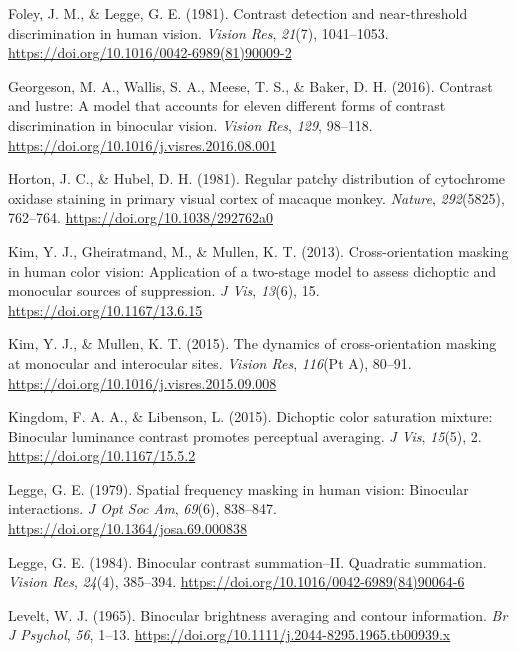 \documentclass[
  letterpaper,
  DIV=11,
  numbers=noendperiod]{scrartcl}
\newlength{\cslhangindent}
\newlength{\cslentryspacingunit} %
\newenvironment{CSLReferences}[2] %
 {%
  \setlength{\parindent}{0pt}
  \ifodd #1
  \let\oldpar\par
  \def\par{\hangindent=\cslhangindent\oldpar}
  \fi
  \setlength{\parskip}{#2\cslentryspacingunit}
 }%
 {}
\begin{document}
\begin{CSLReferences}{1}{0}
\leavevmode{}%
Foley, J. M., \& Legge, G. E. (1981). Contrast detection and
near-threshold discrimination in human vision. \emph{Vision Res},
\emph{21}(7), 1041--1053.
\url{https://doi.org/10.1016/0042-6989(81)90009-2}

\leavevmode{}%
Georgeson, M. A., Wallis, S. A., Meese, T. S., \& Baker, D. H. (2016).
Contrast and lustre: A model that accounts for eleven different forms of
contrast discrimination in binocular vision. \emph{Vision Res},
\emph{129}, 98--118. \url{https://doi.org/10.1016/j.visres.2016.08.001}

\leavevmode{}%
Horton, J. C., \& Hubel, D. H. (1981). Regular patchy distribution of
cytochrome oxidase staining in primary visual cortex of macaque monkey.
\emph{Nature}, \emph{292}(5825), 762--764.
\url{https://doi.org/10.1038/292762a0}

\leavevmode{}%
Kim, Y. J., Gheiratmand, M., \& Mullen, K. T. (2013). Cross-orientation
masking in human color vision: Application of a two-stage model to
assess dichoptic and monocular sources of suppression. \emph{J Vis},
\emph{13}(6), 15. \url{https://doi.org/10.1167/13.6.15}

\leavevmode{}%
Kim, Y. J., \& Mullen, K. T. (2015). The dynamics of cross-orientation
masking at monocular and interocular sites. \emph{Vision Res},
\emph{116}(Pt A), 80--91.
\url{https://doi.org/10.1016/j.visres.2015.09.008}

\leavevmode{}%
Kingdom, F. A. A., \& Libenson, L. (2015). Dichoptic color saturation
mixture: Binocular luminance contrast promotes perceptual averaging.
\emph{J Vis}, \emph{15}(5), 2. \url{https://doi.org/10.1167/15.5.2}

\leavevmode{}%
Legge, G. E. (1979). Spatial frequency masking in human vision:
Binocular interactions. \emph{J Opt Soc Am}, \emph{69}(6), 838--847.
\url{https://doi.org/10.1364/josa.69.000838}

\leavevmode{}%
Legge, G. E. (1984). Binocular contrast summation--II. Quadratic
summation. \emph{Vision Res}, \emph{24}(4), 385--394.
\url{https://doi.org/10.1016/0042-6989(84)90064-6}

\leavevmode{}%
Levelt, W. J. (1965). Binocular brightness averaging and contour
information. \emph{Br J Psychol}, \emph{56}, 1--13.
\url{https://doi.org/10.1111/j.2044-8295.1965.tb00939.x}


\end{CSLReferences}
\end{document}
